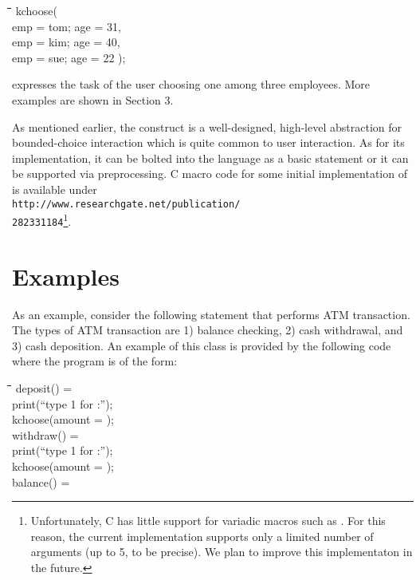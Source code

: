 \documentclass[letter]{ieice}
\newenvironment{exmple}{
 \begingroup \begin{tabbing} \hspace{2em}\= \hspace{3em}\= \hspace{3em}\=
\hspace{3em}\= \hspace{3em}\= \hspace{3em}\= \kill}{
 \end{tabbing}\endgroup}
\newcommand{\kch}{kchoose}
\begin{document}
\begin{exmple}
\kch( \\
 \>           emp = tom;  age = 31, \\
  \>          emp = kim; age = 40, \\
 \>           emp = sue; age = 22 );
\end{exmple}
\noindent expresses the task of the user choosing one among
three employees. More examples are shown in Section 3.



As mentioned earlier, the   construct is a well-designed, 
high-level abstraction for bounded-choice interaction which is quite common to
user interaction. As for its implementation,
it can be bolted into the language as a basic statement or it can be supported via preprocessing.
C macro code for some initial implementation of   is available under \\
{\tt http://www.researchgate.net/publication/} \\ 
{\tt 282331184}\footnote{
Unfortunately, C has little support for variadic macros such as . 
For this reason, the current implementation supports only a limited number of arguments (up to 5, to be precise).
 We plan to improve this implementaton in the future.
}.

\section{Examples }\label{sec:modules}



As an  example, consider the following
statement that performs ATM transaction. The types of ATM transaction are
1) balance checking, 2) cash withdrawal, and 3) cash deposition.
An example of this class is provided by the
following code where the program  is of the form:

\begin{exmple}
deposit() =  \\
 print(``type 1 for \5:''); \\
\kch(amount = \5);   \\

withdraw() = \\
 print(``type 1 for \5:''); \\
 \kch(amount = \5);  \\

balance() =    \\
\end{exmple}
\end{document}
